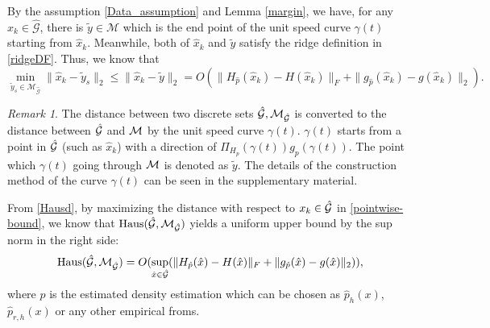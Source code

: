 \documentclass[aos,preprint]{imsart}
\theoremstyle{remark}
\newtheorem*{remark}{Remark}
\begin{document}
By the assumption \ref{Data_assumption} and Lemma \ref{margin}, we have, for any $\hat{x}_k\in \hat{\mathcal G}$, there is $\tilde{y}\in {\mathcal M}$ which is the end point of the unit speed curve $\gamma(t)$ starting from $\hat{x}_k$. Meanwhile, both of $\hat{x}_k$ and $\tilde{y}$ satisfy the ridge definition in \eqref{ridgeDF}. 
Thus, we know that 
\begin{equation}\label{pointwise-bound}
\min_{\tilde{y}_s\in {\mathcal M}_{\hat{\mathcal G}}}\|\hat{x}_k-\tilde{y}_s\|_2 \leq \|\hat{x}_k-\tilde{y}\|_2 = O (\|H_{\hat{p}}(\hat{x}_k)-H(\hat{x}_k)\|_F+\|g_{\hat{p}}(\hat{x}_k)-g(\hat{x}_k)\|_2  ).
\end{equation}
\begin{remark}
The distance between two discrete sets $\hat{\cal G}, {\cal M}_{\hat{\cal G}}$ is converted to the distance between $\hat{\cal G}$ and ${\cal M}$ by the unit speed curve $\gamma(t)$. $\gamma(t)$ starts from a point in $\hat{\cal G}$ (such as $\hat{x}_k$) with a direction of $\Pi_{H_p}(\gamma(t)) g_{p}(\gamma(t))$. The point which $\gamma(t)$ going through $\cal M$ is denoted as $\tilde{y}$. The details of the construction method of the curve $\gamma(t)$ can be seen in the supplementary material.
\end{remark}
From \eqref{Hausd}, by maximizing the distance with respect to $x_k\in 
\hat{\cal G}$ in \eqref{pointwise-bound}, we know that ${\rm Haus}({\mathcal {\hat{G}}}, {\mathcal M}_{\mathcal {\hat{G}}})$ yields a uniform upper bound by the sup norm in the right side:
\begin{equation}\label{Hausmargin}
{\rm Haus}({\hat{\mathcal G}}, {\mathcal M}_{\hat{\mathcal G}}) = O (\sup_{\hat{x}\in\hat{\cal G}}( \|H_{\hat{p}}(\hat{x})-H(\hat{x})\|_F+\|g_{\hat{p}}(\hat{x})-g(\hat{x})\|_2 ) ),
\end{equation}
where $\hat{p}$ is the estimated density estimation which can be chosen as $\hat{p}_h(x)$, $\hat{p}_{r,h}(x)$ or any other empirical froms.
\end{document}

